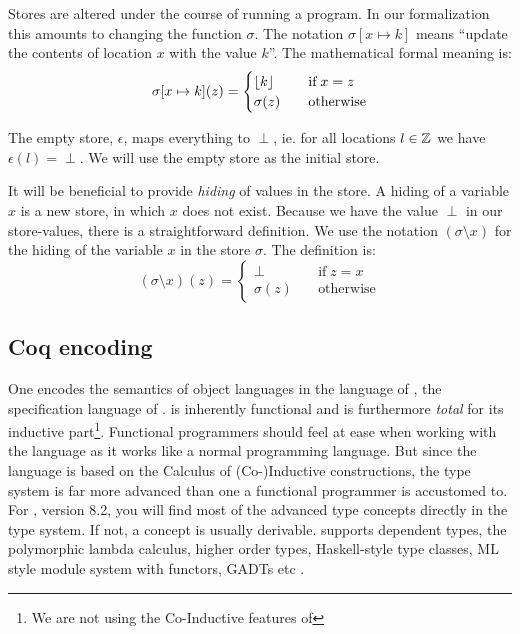 Stores are altered under the course of running a program. In our
formalization this amounts to changing the function
$\sigma$. The notation $\sigma[x \mapsto k]$ means ``update the contents
of location $x$ with the value $k$''. The mathematical formal meaning
is:
\begin{equation*}
  \sigma[x \mapsto k](z) = \begin{cases}
    \lfloor k \rfloor & \quad \text{if} \; x = z\\
    \sigma(z)  & \quad \text{otherwise}
  \end{cases}
\end{equation*}

The empty store, $\epsilon$, maps everything to $\perp$, ie. for all
locations $l \in \mathbb{Z}$ we have $\epsilon(l) = \perp$. We will use the
empty store as the initial store.

It will be beneficial to provide \emph{hiding} of values in the store. A
hiding of a variable $x$ is a new store, in which $x$ does not
exist. Because we have the value $\perp$ in our store-values, there is
a straightforward definition. We use the notation $(\sigma \setminus x)$
for the hiding of the variable $x$ in the store $\sigma$. The definition
is:
\begin{equation*}
  (\sigma \setminus x)(z) = \begin{cases}
    \perp & \quad \text{if} \; z = x\\
    \sigma(z) & \quad \text{otherwise}
  \end{cases}
\end{equation*}

\subsection{Coq encoding}

One encodes the semantics of object languages in the language of
\gallina{}, the specification language of \coq{}. \gallina{} is
inherently functional and is furthermore \emph{total} for its
inductive part\footnote{We are not using the Co-Inductive features of
  \coq{}}. Functional programmers should feel at ease when working
with the language as it works like a normal programming language. But
since the language is based on the Calculus of (Co-)Inductive
constructions, the type system is far more advanced than one a
functional programmer is accustomed to. For \coq{}, version 8.2, you
will find most of the advanced type concepts directly in the type
system. If not, a concept is usually derivable. \coq{} supports
dependent types, the polymorphic lambda calculus, higher order types,
Haskell-style type classes, ML style module system with functors,
GADTs etc \cite{pierce:advanced, pierce:types, hall.hammond.ea:type,
  milner.tofte.ea:definition}.

